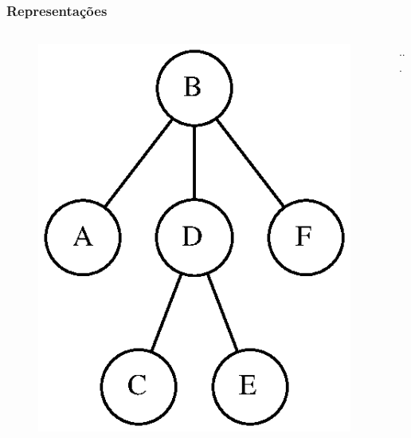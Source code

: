 \documentclass[aspectratio=169]{beamer}
\begin{document}
\begin{frame}[fragile]\frametitle{Representações}
\begin{columns}[T]
\begin{column}{0.5\linewidth}
\begin{figure}[h]
	\centering
	\includegraphics[height=0.4\paperheight]{imagens/arvore_c.eps}
\end{figure}
\end{column}
\begin{column}{0.5\linewidth}
...
\end{column}
\end{columns}
\end{frame}
\end{document}

